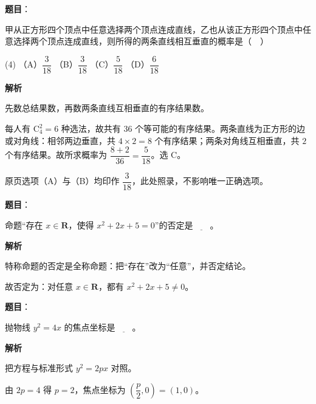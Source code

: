\begin{answer}

\textbf{题目}：

甲从正方形四个顶点中任意选择两个顶点连成直线，乙也从该正方形四个顶点中任意选择两个顶点连成直线，则所得的两条直线相互垂直的概率是（　）

\begin{gkopts}(4)
\task （A）$\dfrac3{18}$
\task （B）$\dfrac3{18}$
\task （C）$\dfrac5{18}$
\task （D）$\dfrac6{18}$
\end{gkopts}

\textbf{解析}

先数总结果数，再数两条直线互相垂直的有序结果数。

每人有 $\mathrm C_4^2=6$ 种选法，故共有 $36$ 个等可能的有序结果。两条直线为正方形的边或对角线：相邻两边垂直，共 $4\times2=8$ 个有序结果；两条对角线互相垂直，共 $2$ 个有序结果。故所求概率为 $\dfrac{8+2}{36}=\dfrac5{18}$。选 C。

原页选项（A）与（B）均印作 $\dfrac3{18}$，此处照录，不影响唯一正确选项。


\end{answer}
\begin{answer}

\textbf{题目}：

命题“存在 $x\in\mathbf R$，使得 $x^2+2x+5=0$”的否定是$\underline{\qquad}$。

\textbf{解析}

特称命题的否定是全称命题：把“存在”改为“任意”，并否定结论。

故否定为：对任意 $x\in\mathbf R$，都有 $x^2+2x+5\neq0$。


\end{answer}
\begin{answer}

\textbf{题目}：

抛物线 $y^2=4x$ 的焦点坐标是$\underline{\qquad}$。

\textbf{解析}

把方程与标准形式 $y^2=2px$ 对照。

由 $2p=4$ 得 $p=2$，焦点坐标为 $\left(\dfrac p2,0\right)=(1,0)$。


\end{answer}
